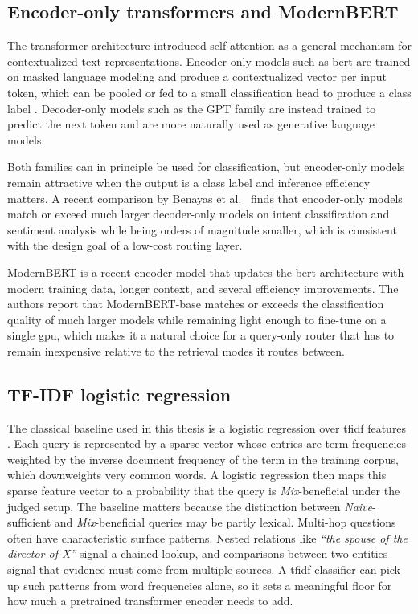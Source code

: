 \documentclass[english, bibtex]{kththesis}               %
\numberwithin{listing}{chapter}
\begin{document}
\subsection{Encoder-only transformers and ModernBERT}
\label{sec:backgroundEncoders}

The transformer architecture \cite{vaswani2017attention} introduced self-attention as a general mechanism for contextualized text representations. Encoder-only models such as \gls{bert} are trained on masked language modeling and produce a contextualized vector per input token, which can be pooled or fed to a small classification head to produce a class label \cite{devlin2019bert}. Decoder-only models such as the GPT family are instead trained to predict the next token and are more naturally used as generative language models.

Both families can in principle be used for classification, but encoder-only models remain attractive when the output is a class label and inference efficiency matters. A recent comparison by Benayas et al.\ \cite{benayas2024encoder} finds that encoder-only models match or exceed much larger decoder-only models on intent classification and sentiment analysis while being orders of magnitude smaller, which is consistent with the design goal of a low-cost routing layer.

ModernBERT \cite{warner2024modernbert} is a recent encoder model that updates the \gls{bert} architecture with modern training data, longer context, and several efficiency improvements. The authors report that ModernBERT-base matches or exceeds the classification quality of much larger models while remaining light enough to fine-tune on a single \gls{gpu}, which makes it a natural choice for a query-only router that has to remain inexpensive relative to the retrieval modes it routes between.

\subsection{TF-IDF logistic regression}
\label{sec:backgroundTfidf}

The classical baseline used in this thesis is a logistic regression over \gls{tfidf} features \cite{salton1988termweighting}. Each query is represented by a sparse vector whose entries are term frequencies weighted by the inverse document frequency of the term in the training corpus, which downweights very common words. A logistic regression then maps this sparse feature vector to a probability that the query is \emph{Mix}-beneficial under the judged setup. The baseline matters because the distinction between \emph{Naive}-sufficient and \emph{Mix}-beneficial queries may be partly lexical. Multi-hop questions often have characteristic surface patterns. Nested relations like \emph{``the spouse of the director of X''} signal a chained lookup, and comparisons between two entities signal that evidence must come from multiple sources. A \gls{tfidf} classifier can pick up such patterns from word frequencies alone, so it sets a meaningful floor for how much a pretrained transformer encoder needs to add.
\end{document}
